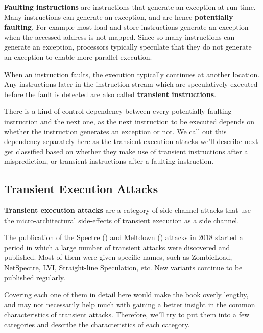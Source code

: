 \documentclass[
  a4paper,
]{report}
\begin{document}
\textbf{\label{__index_entry_175}{Faulting
instructions}} are instructions that
generate an exception at run-time. Many instructions can generate an
exception, and are hence \textbf{potentially faulting}. For example most
load and store instructions generate an exception when the accessed
address is not mapped. Since so many instructions can generate an
exception, processors typically speculate that they do not generate an
exception to enable more parallel execution.

When an instruction faults, the execution typically continues at another
location. Any instructions later in the instruction stream which are
speculatively executed before the fault is detected are also called
\textbf{\label{__index_entry_176}{transient
instructions}}.

There is a kind of control dependency between every potentially-faulting
instruction and the next one, as the next instruction to be executed
depends on whether the instruction generates an exception or not. We
call out this dependency separately here as the transient execution
attacks we'll describe next get classified based on whether they make
use of transient instructions after a misprediction, or transient
instructions after a faulting instruction.

\subsection{Transient Execution
Attacks}\label{transient-execution-attacks-1}

\textbf{\label{__index_entry_177}{Transient execution
attacks}} are a category of
side-channel attacks that use the micro-architectural side-effects of
transient execution as a side channel.

The publication of the
\label{__index_entry_178}{Spectre}
() and
\label{__index_entry_179}{Meltdown}
() attacks in 2018 started a
period in which a large number of transient attacks were discovered and
published. Most of them were given specific names, such as ZombieLoad,
NetSpectre, LVI, Straight-line Speculation, etc. New variants continue
to be published regularly.

Covering each one of them in detail here would make the book overly
lengthy, and may not necessarily help much with gaining a better insight
in the common characteristics of transient attacks. Therefore, we'll try
to put them into a few categories and describe the characteristics of
each category.
\end{document}
